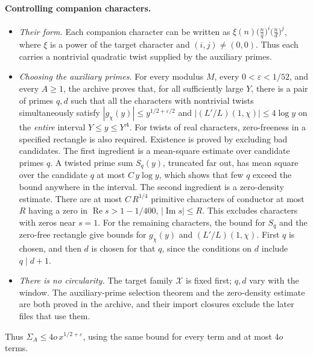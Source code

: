 \documentclass[11pt]{article}
\renewcommand{\Re}{\operatorname{Re}}
\renewcommand{\Im}{\operatorname{Im}}
\begin{document}
\paragraph{Controlling companion characters.}
\begin{itemize}
\item \emph{Their form.} Each companion character can be written as $\xi(n)\bigl(\tfrac nq\bigr)^i\bigl(\tfrac nd\bigr)^j$, where $\xi$ is a power of the target character and $(i,j)\ne(0,0)$. Thus each carries a nontrivial quadratic twist supplied by the auxiliary primes.
\item \emph{Choosing the auxiliary primes.} For every modulus $M$, every $0<\varepsilon<1/52$, and every $A\ge1$, the archive proves that, for all sufficiently large $Y$, there is a pair of primes $q,d$ such that all the characters with nontrivial twists simultaneously satisfy $|g_\chi(y)|\le y^{1/2+\varepsilon/2}$ and $|(L'/L)(1,\chi)|\le4\log y$ on the \emph{entire} interval $Y\le y\le Y^A$. For twists of real characters, zero-freeness in a specified rectangle is also required. Existence is proved by excluding bad candidates. The first ingredient is a mean-square estimate over candidate primes $q$. A twisted prime sum $S_q(y)$, truncated far out, has mean square over the candidate $q$ at most $C\,y\log y$, which shows that few $q$ exceed the bound anywhere in the interval. The second ingredient is a zero-density estimate. There are at most $C\,R^{1/4}$ primitive characters of conductor at most $R$ having a zero in $\Re s>1-1/400$, $|\Im s|\le R$. This excludes characters with zeros near $s=1$. For the remaining characters, the bound for $S_q$ and the zero-free rectangle give bounds for $g_\chi(y)$ and $(L'/L)(1,\chi)$. First $q$ is chosen, and then $d$ is chosen for that $q$, since the conditions on $d$ include $q\mid d+1$.
\item \emph{There is no circularity.} The target family $\mathcal X$ is fixed first; $q,d$ vary with the window. The auxiliary-prime selection theorem and the zero-density estimate are both proved in the archive, and their import closures exclude the later files that use them.
\end{itemize}
Thus $\Sigma_A\le4o\,x^{1/2+\varepsilon}$, using the same bound for every term and at most $4o$ terms.
\end{document}
